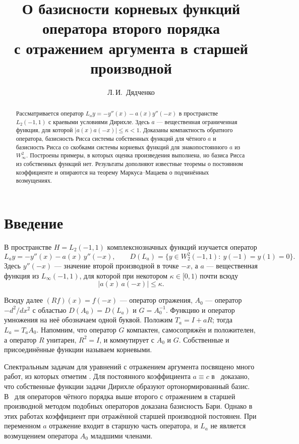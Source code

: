 \documentclass[12pt,a4paper]{article}
\title{О базисности корневых функций оператора второго порядка\\
с отражением аргумента в старшей производной}
\author{Л.\,И.~Дядченко}
\date{}
\theoremstyle{definition}
\newcommand{\abs}[1]{\lvert#1\rvert}
\begin{document}
\maketitle
\begin{abstract}
Рассматривается оператор $L_ay=-y''(x)-a(x)y''(-x)$ в пространстве $L_2(-1,1)$ с
краевыми условиями Дирихле. Здесь $a$ --- вещественная ограниченная функция, для которой
$\abs{a(x)a(-x)}\le\kappa<1$. Доказаны компактность обратного оператора, базисность Рисса
системы собственных функций для чётного $a$ и базисность Рисса со скобками системы
корневых функций для знакопостоянного $a$ из $W^2_\infty$. Построены примеры, в которых
оценка произведения выполнена, но базиса Рисса из собственных функций нет. Результаты
дополняют известные теоремы о постоянном коэффициенте и опираются на теорему
Маркуса--Мацаева о подчинённых возмущениях.
\end{abstract}

\section{Введение}
В пространстве $H=L_2(-1,1)$ комплекснозначных функций изучается оператор
\begin{equation}\label{eq:op}
 L_ay=-y''(x)-a(x)\,y''(-x),\qquad
 D(L_a)=\{y\in W_2^2(-1,1):\ y(-1)=y(1)=0\}.
\end{equation}
Здесь $y''(-x)$ --- значение второй производной в точке $-x$, а $a$ --- вещественная
функция из $L_\infty(-1,1)$, для которой при некотором $\kappa\in[0,1)$ почти всюду
\begin{equation}\label{eq:bound}
 \abs{a(x)\,a(-x)}\le\kappa .
\end{equation}

Всюду далее $(Rf)(x)=f(-x)$ --- оператор отражения, $A_0$ --- оператор $-d^2/dx^2$ с
областью $D(A_0)=D(L_a)$ и $G=A_0^{-1}$. Функцию и оператор умножения на неё обозначаем
одной буквой. Положим $T_a=I+aR$; тогда $L_a=T_aA_0$. Напомним, что оператор $G$
компактен, самосопряжён и положителен, а оператор $R$ унитарен, $R^2=I$, и коммутирует с
$A_0$ и $G$. Собственные и присоединённые функции называем корневыми.

Спектральным задачам для уравнений с отражением аргумента посвящено много работ, из
которых отметим \cite{Pol,KS}. Для постоянного коэффициента $a\equiv c$
в~\cite[теорема~4.1]{KS} доказано, что собственные функции задачи Дирихле образуют
ортонормированный базис. В~\cite[теорема~1.1]{Pol} для операторов чётного порядка выше
второго с отражением в старшей производной методом подобных операторов доказана
базисность Бари. Однако в этих работах коэффициент при отражённой старшей производной
постоянен. При переменном $a$ отражение входит в старшую часть оператора, и $L_a$ не
является возмущением оператора $A_0$ младшими членами.
\end{document}
